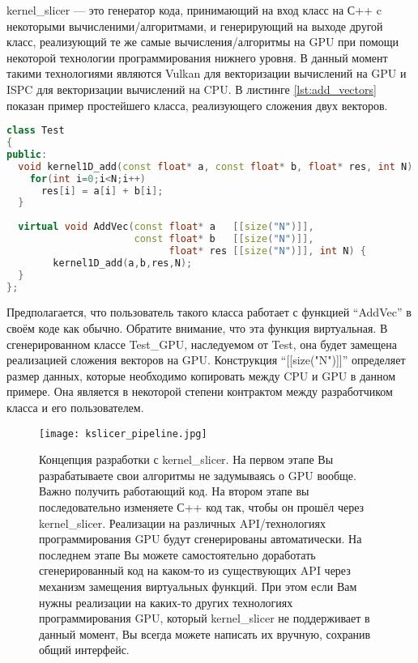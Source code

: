 \documentclass[11pt,fleqn,english,russian]{report} %
\begin{document}
kernel\_slicer --- это генератор кода, принимающий на вход класс на С++ c некоторыми вычисленими/алгоритмами, и генерирующий на выходе другой класс, реализующий те же самые вычисления/алгоритмы на GPU при помощи некоторой технологии программирования нижнего уровня. В данный момент такими технологиями являются Vulkan для векторизации вычислений на GPU и ISPC \cite{ispc} для векторизации вычислений на CPU. В листинге \ref{lst:add_vectors} показан пример простейшего класса, реализующего сложения двух векторов.

\begin{lstlisting}[language=C++, caption=сложение двух векторов]
class Test 
{
public:	
  void kernel1D_add(const float* a, const float* b, float* res, int N) {
    for(int i=0;i<N;i++)
      res[i] = a[i] + b[i];
  } 
	
  virtual void AddVec(const float* a   [[size("N")]], 
                      const float* b   [[size("N")]], 
                            float* res [[size("N")]], int N) {
		kernel1D_add(a,b,res,N); 
  } 	
};
\end{lstlisting}\label{lst:add_vectors}

Предполагается, что пользователь такого класса работает с функцией ``AddVec'' в своём коде как обычно. Обратите внимание, что эта функция виртуальная. В сгенерированном классе Test\_GPU, наследуемом от Test, она будет замещена реализацией сложения векторов на GPU. Конструкция ``[[size("N")]]'' определяет размер данных, которые необходимо копировать между CPU и GPU в данном примере. Она является в некоторой степени контрактом между разработчиком класса и его пользователем.


\begin{figure}[h!]
	\centering
	\texttt{[image: kslicer\_pipeline.jpg]}
	\caption{Концепция разработки с kernel\_slicer. На первом этапе Вы разрабатываете свои алгоритмы не задумываясь о GPU вообще. Важно получить работающий код. На втором этапе вы последовательно изменяете С++ код так, чтобы он прошёл через kernel\_slicer. Реализации на различных API/технологиях программирования GPU будут сгенерированы автоматически. На последнем этапе Вы можете самостоятельно доработать сгенерированный код на каком-то из существующих API через механизм замещения виртуальных функций. При этом если Вам нужны реализации на каких-то других технологиях программирования GPU, который kernel\_slicer не поддерживает в данный момент, Вы всегда можете написать их вручную, сохранив общий интерфейс. }
\end{figure}
\end{document}
